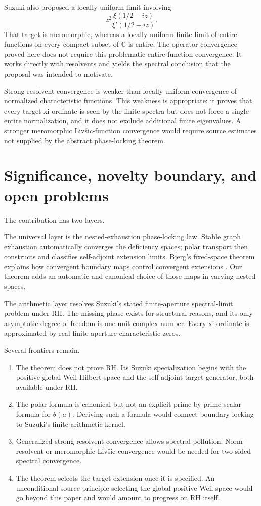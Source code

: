 \documentclass[11pt]{article}
\theoremstyle{remark}
\newcommand{\C}{\mathbb C}
\begin{document}
Suzuki also proposed a locally uniform limit involving
\[
 z^2\frac{\xi(1/2-iz)}{\xi'(1/2-iz)}.
\]
That target is meromorphic, whereas a locally uniform finite limit of entire functions on every
compact subset of $\C$ is entire.  The operator convergence proved here does not require this
problematic entire-function convergence.  It works directly with resolvents and yields the
spectral conclusion that the proposal was intended to motivate.

Strong resolvent convergence is weaker than locally uniform convergence of normalized
characteristic functions.  This weakness is appropriate: it proves that every target xi ordinate is
seen by the finite spectra but does not force a single entire normalization, and it does not exclude
additional finite eigenvalues.  A stronger meromorphic Liv\v{s}ic-function convergence would
require source estimates not supplied by the abstract phase-locking theorem.

\section{Significance, novelty boundary, and open problems}

The contribution has two layers.

The universal layer is the nested-exhaustion phase-locking law.  Stable graph exhaustion
automatically converges the deficiency spaces; polar transport then constructs and classifies
self-adjoint extension limits.  Bjerg's fixed-space theorem explains how convergent boundary maps
control convergent extensions \cite{Bjerg2024}.  Our theorem adds an automatic and canonical choice
of those maps in varying nested spaces.

The arithmetic layer resolves Suzuki's stated finite-aperture spectral-limit problem under RH.
The missing phase exists for structural reasons, and its only asymptotic degree of freedom is one
unit complex number.  Every xi ordinate is approximated by real finite-aperture characteristic
zeros.

Several frontiers remain.

\begin{enumerate}
 \item The theorem does not prove RH.  Its Suzuki specialization begins with the positive global
 Weil Hilbert space and the self-adjoint target generator, both available under RH.
 \item The polar formula is canonical but not an explicit prime-by-prime scalar formula for
 $\theta(a)$.  Deriving such a formula would connect boundary locking to Suzuki's finite arithmetic
 kernel.
 \item Generalized strong resolvent convergence allows spectral pollution.  Norm-resolvent or
 meromorphic Liv\v{s}ic convergence would be needed for two-sided spectral convergence.
 \item The theorem selects the target extension once it is specified.  An unconditional source
 principle selecting the global positive Weil space would go beyond this paper and would amount to
 progress on RH itself.
\end{enumerate}
\end{document}
